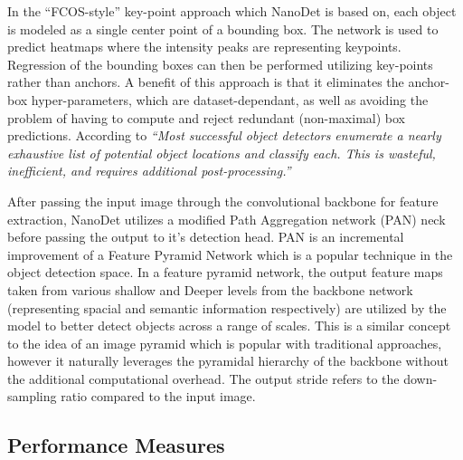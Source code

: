 \documentclass[a4paper,twoside,12pt]{report}
\begin{document}
In the ``FCOS-style'' key-point approach which NanoDet is based on, each object is modeled as a single center point of a bounding box. The network is used to predict heatmaps where the intensity peaks are representing keypoints. Regression of the bounding boxes can then be performed utilizing key-points rather than anchors. A benefit of this approach is that it eliminates the anchor-box hyper-parameters, which are dataset-dependant, as well as avoiding the problem of having to compute and reject redundant (non-maximal) box predictions. According to \cite{cnet} \textit{``Most successful object detectors enumerate a nearly exhaustive list of potential object locations and classify each. This is wasteful, inefficient, and requires additional post-processing.''}   

After passing the input image through the convolutional backbone for feature extraction, NanoDet utilizes a modified Path Aggregation network (PAN) \citep{pan} neck before passing the output to it's detection head. PAN is an incremental improvement of a Feature Pyramid Network \citep{fpn} which is a popular technique in the object detection space. In a feature pyramid network, the output feature maps taken from various shallow and Deeper levels from the backbone network (representing spacial and semantic information respectively) are utilized by the model to better detect objects across a range of scales. This is a similar concept to the idea of an image pyramid which is popular with traditional approaches, however it naturally leverages the pyramidal hierarchy of the backbone without the additional computational overhead. The output stride refers to the down-sampling ratio compared to the input image. 

\subsection{Performance Measures}
\end{document}
